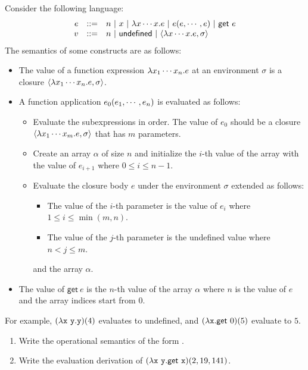 \begin{exercise}

Consider the following language:
\[
  \begin{array}{rrl}
  e & ::= & n\ |\ x\ |\ \efun{x\cdots x}{e}\ |\ \eappfo{e}{e,\cdots,e}\ |\ \textsf{get}\ e \\
  v & ::= & n\ |\ \textsf{undefined}\ |\ \clov{x\cdots x}{e}{\sigma} \\
  \end{array}
\]
The semantics of some constructs are as follows:
\begin{itemize}
  \item The value of a function expression $\lambda x_1\cdots x_n.e$
    at an environment $\sigma$ is a closure $\langle\lambda x_1\cdots x_n.e,\sigma\rangle$.
  \item A function application $e_0(e_1,\cdots,e_n)$ is evaluated as follows:
    \begin{itemize}
      \item Evaluate the subexpressions in order.
        The value of $e_0$ should be a closure
        $\langle\lambda x_1\cdots x_m.e,\sigma\rangle$
        that has $m$ parameters.
      \item Create an array $\alpha$ of size $n$ and
        initialize the $i$-th value of the array with the value of $e_{i+1}$
        where $0 \le i \le n-1$.
      \item Evaluate the closure body $e$ under the environment $\sigma$
        extended as follows:
        \begin{itemize}
          \item The value of the $i$-th parameter is the value of $e_i$
            where $1 \le i \le \min{(m,n)}$.
          \item The value of the $j$-th parameter is the \textsf{undefined}
            value where $n < j \le m$.
        \end{itemize}
        and the array $\alpha$.
    \end{itemize}
  \item The value of $\textsf{get}\ e$ is the $n$-th value of the array $\alpha$
    where $n$ is the value of $e$ and the array indices start from $0$.
\end{itemize}

For example,
$\eappfo{(\efun{\cx\ \cy}{\cy})}{4}$
evaluates to \textsf{undefined}, and
$(\lambda\texttt{x}.\textsf{get}\ 0)(5)$
evaluate to $5$.

\begin{enumerate}
  \item Write the operational semantics of the form
    .
  \item Write the evaluation derivation of
    $\eappfo{(\efun{\cx\ \cy}{\textsf{get}\ \cx})}{2,19,141}$.
\end{enumerate}

\end{exercise}

